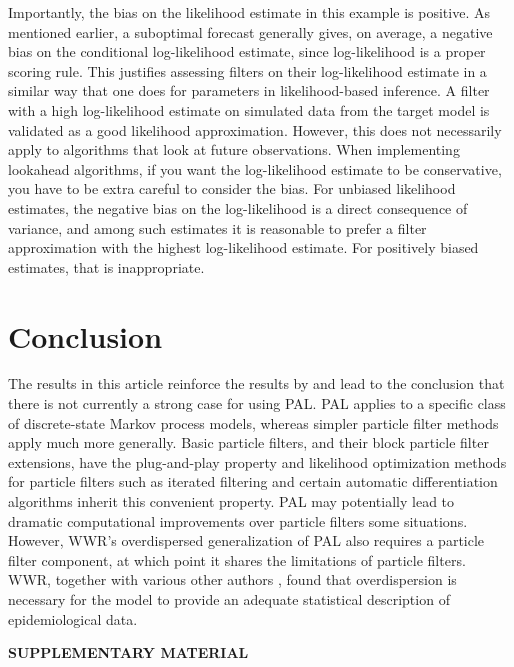 \documentclass{article}
\begin{document}
Importantly, the bias on the likelihood estimate in this example is positive. 
As mentioned earlier, a suboptimal forecast generally gives, on average, a negative bias on the conditional log-likelihood estimate, since log-likelihood is a proper scoring rule. 
This justifies assessing filters on their log-likelihood estimate in a similar way that one does for parameters in likelihood-based inference. 
A filter with a high log-likelihood estimate on simulated data from the target model is validated as a good likelihood approximation.
However, this does not necessarily apply to algorithms that look at future observations. When implementing lookahead algorithms, if you want the log-likelihood estimate to be conservative, you have to be extra careful to consider the bias. 
For unbiased likelihood estimates, the negative bias on the log-likelihood is a direct consequence of variance, and among such estimates it is reasonable to prefer a filter approximation with the highest log-likelihood estimate. 
For positively biased estimates, that is inappropriate.

\section{Conclusion} \label{sec:conclusion}

The results in this article reinforce the results by \citet{hao24-arxiv} and lead to the conclusion that there is not currently a strong case for using PAL. 
PAL applies to a specific class of discrete-state Markov process models, whereas simpler particle filter methods apply much more generally.
Basic particle filters, and their block particle filter extensions, have the plug-and-play property \citep{breto09,he10} and likelihood optimization methods for particle filters such as iterated filtering \citep{ionides15} and certain automatic differentiation algorithms \citep{tan24} inherit this convenient property. 
PAL may potentially lead to dramatic computational improvements over particle filters some situations.
However, WWR's overdispersed generalization of PAL also requires a particle filter component, at which point it shares the limitations of particle filters.
WWR, together with various other authors \citep{stocks18,he10}, found that overdispersion is necessary for the model to provide an adequate statistical description of epidemiological data.



\bigskip
\newpage
\begin{center}
	{\large\bf SUPPLEMENTARY MATERIAL}
\end{center}
\end{document}
